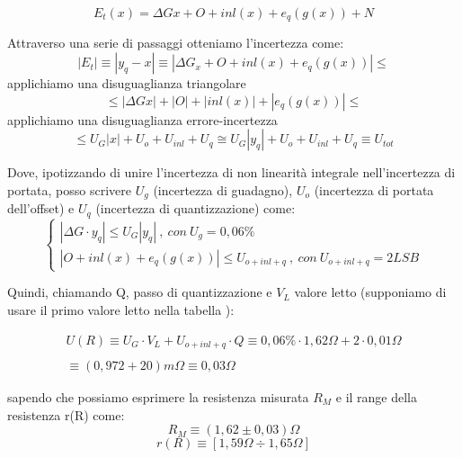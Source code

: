 \begin{equation}
    E_t(x) = \Delta Gx + O + inl(x) + e_q(g(x)) + N
\end{equation}


Attraverso una serie di passaggi otteniamo l'incertezza come:
\begin{equation}
    |E_t| \equiv |y_q - x| \equiv | \Delta G_x + O + inl(x) + e_q(g(x)) | \leq 
\end{equation}
applichiamo una disuguaglianza triangolare
\begin{equation*}
    \leq | \Delta Gx | + | O | + | inl(x) | + | e_q(g(x)) | \leq 
\end{equation*}
applichiamo una disuguaglianza errore-incertezza
\begin{equation*}
    \leq U_G|x| + U_o + U_{inl} + U_q \cong U_G|y_q| + U_o + U_{inl} +U_q \equiv U_{tot}
\end{equation*}

Dove, ipotizzando di unire l'incertezza di non linearità integrale nell'incertezza di portata, posso scrivere $U_g$ (incertezza di guadagno), $U_o$ (incertezza di portata dell'offset) e $U_q$ (incertezza di quantizzazione) come: 
\begin{equation}
\left\{\begin{array}{l}
    | \Delta G \cdot y_q | \leq U_G |y_q| \ , \ con \ U_g=0,06\% \\
| O + inl(x) + e_q(g(x)) | \leq U_{o+inl+q} \ , \ con \ U_{o+inl+q}=2LSB
\end{array}\right.
\end{equation}

Quindi, chiamando Q, passo di quantizzazione e $V_L$ valore letto (supponiamo di usare il primo valore letto nella tabella \label{mult_port}):

\begin{equation*}
\begin{array}{l}
U(R) \equiv U_G \cdot V_L + U_{o+inl+q} \cdot Q \equiv 0,06\% \cdot 1,62\Omega + 2 \cdot 0,01 \Omega \\ \\
\equiv (0,972 + 20) m\Omega \equiv 0,03 \Omega
\end{array}
\end{equation*}

sapendo che possiamo esprimere la resistenza misurata $R_M$ e il range della resistenza r(R) come:
\begin{equation*}
    R_M \equiv(1,62 \pm 0,03) \Omega
\end{equation*}
\begin{equation*}
    r(R) \equiv [1,59 \Omega \div 1,65 \Omega]
\end{equation*}

